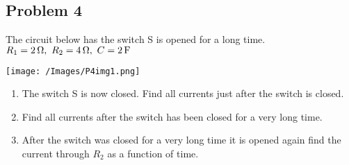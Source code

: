\subsection*{Problem 4}
The circuit below has the switch S is opened for a long time. $R_1=2\units{\Omega},\ R_2=4\units{\Omega},\ C=2\units{F}$\\
\centerline{\texttt{[image: /Images/P4img1.png]}}
\begin{enumerate}
    \item The switch S is now closed. Find all currents just after the switch is closed.
    \item Find all currents after the switch has been closed for a very long time.
    \item After the switch was closed for a very long time it is opened again find the current
    through $R_2$ as a function of time.
\end{enumerate}

